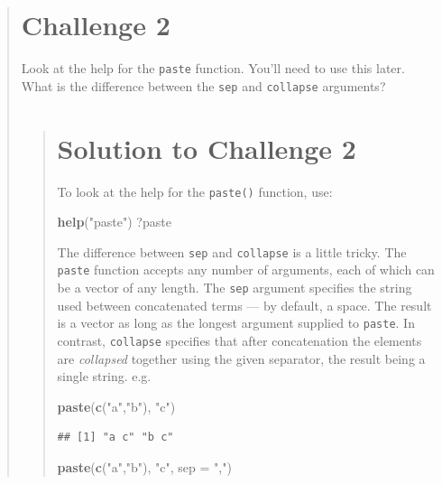 \documentclass[]{book}
\newenvironment{Shaded}{\begin{snugshade}}{\end{snugshade}}
\newcommand{\KeywordTok}[1]{\textcolor[rgb]{0.13,0.29,0.53}{\textbf{#1}}}
\newcommand{\DataTypeTok}[1]{\textcolor[rgb]{0.13,0.29,0.53}{#1}}
\newcommand{\StringTok}[1]{\textcolor[rgb]{0.31,0.60,0.02}{#1}}
\newcommand{\NormalTok}[1]{#1}
\begin{document}
\begin{quote}
\section{Challenge 2}\label{challenge-2}

Look at the help for the \texttt{paste} function. You'll need to use
this later. What is the difference between the \texttt{sep} and
\texttt{collapse} arguments?

\begin{quote}
\section{Solution to Challenge 2}\label{solution-to-challenge-2}

To look at the help for the \texttt{paste()} function, use:

\begin{Shaded}
\begin{Highlighting}[]
\KeywordTok{help}\NormalTok{(}\StringTok{"paste"}\NormalTok{)}
\NormalTok{?paste}
\end{Highlighting}
\end{Shaded}

The difference between \texttt{sep} and \texttt{collapse} is a little
tricky. The \texttt{paste} function accepts any number of arguments,
each of which can be a vector of any length. The \texttt{sep} argument
specifies the string used between concatenated terms --- by default, a
space. The result is a vector as long as the longest argument supplied
to \texttt{paste}. In contrast, \texttt{collapse} specifies that after
concatenation the elements are \emph{collapsed} together using the given
separator, the result being a single string. e.g.

\begin{Shaded}
\begin{Highlighting}[]
\KeywordTok{paste}\NormalTok{(}\KeywordTok{c}\NormalTok{(}\StringTok{"a"}\NormalTok{,}\StringTok{"b"}\NormalTok{), }\StringTok{"c"}\NormalTok{)}
\end{Highlighting}
\end{Shaded}

\begin{verbatim}
## [1] "a c" "b c"
\end{verbatim}

\begin{Shaded}
\begin{Highlighting}[]
\KeywordTok{paste}\NormalTok{(}\KeywordTok{c}\NormalTok{(}\StringTok{"a"}\NormalTok{,}\StringTok{"b"}\NormalTok{), }\StringTok{"c"}\NormalTok{, }\DataTypeTok{sep =} \StringTok{","}\NormalTok{)}
\end{Highlighting}
\end{Shaded}


\end{quote}
\end{quote}
\end{document}
